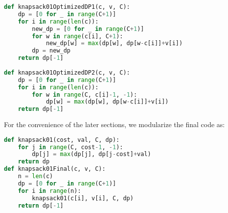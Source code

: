 \documentclass[../main.tex]{subfiles}
\begin{document}
\begin{lstlisting}[language=Python]
def knapsack01OptimizedDP1(c, v, C):
    dp = [0 for _ in range(C+1)] 
    for i in range(len(c)):
        new_dp = [0 for _ in range(C+1)] 
        for w in range(c[i], C+1):
            new_dp[w] = max(dp[w], dp[w-c[i]]+v[i])
        dp = new_dp
    return dp[-1]
    
def knapsack01OptimizedDP2(c, v, C):
    dp = [0 for _ in range(C+1)] 
    for i in range(len(c)):
        for w in range(C, c[i]-1, -1):
            dp[w] = max(dp[w], dp[w-c[i]]+v[i])
    return dp[-1]
\end{lstlisting}
For the convenience of the later sections, we modularize the final code as:
\begin{lstlisting}[language=Python]
def knapsack01(cost, val, C, dp):
    for j in range(C, cost-1, -1):
        dp[j] = max(dp[j], dp[j-cost]+val)
    return dp
def knapsack01Final(c, v, C):
    n = len(c)
    dp = [0 for _ in range(C+1)] 
    for i in range(n):
        knapsack01(c[i], v[i], C, dp)
    return dp[-1]
\end{lstlisting}

\end{document}
